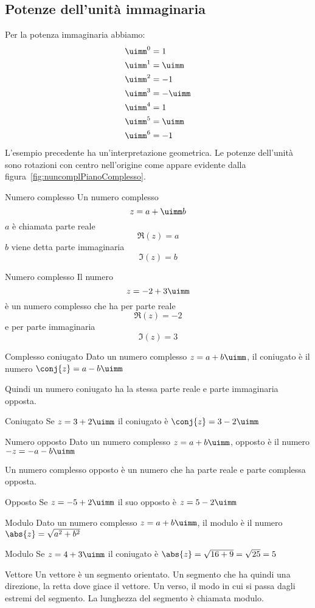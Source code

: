 \subsection{Potenze dell'unità immaginaria}
Per la potenza immaginaria abbiamo:
\begin{align*}
	&\uimm^0=1\\
	&\uimm^1=\uimm\\
	&\uimm^2=-1\\
	&\uimm^3=-\uimm\\
	&\uimm^4=1\\
	&\uimm^5=\uimm\\
	&\uimm^6=-1
\end{align*}
L'esempio precedente ha un'interpretazione geometrica. Le potenze dell'unità sono rotazioni  con  centro nell'origine come appare evidente dalla figura~\vref{fig:nuncomplPianoComplesso}.
\begin{definizionet}{Numero complesso}{}
	 Un numero complesso  \[z=a+\uimm b\] $a$ è chiamata parte reale \[\Re\left(z\right)=a\]
	$b$ viene detta  parte immaginaria\[\Im\left(z\right)=b \] 
\end{definizionet}
\begin{esempiot}{Numero complesso}{}
Il numero \[z=-2+3\uimm \] è un numero complesso che ha per parte reale \[\Re(z)=-2\]  e per parte immaginaria \[\Im(z)=3\]
\end{esempiot}
\begin{definizionet}{Complesso coniugato}{}
	Dato un numero complesso $z=a+b\uimm$, il coniugato è  il numero $\conj{z}=a-b\uimm$
\end{definizionet}
Quindi un numero coniugato ha la stessa parte reale e parte immaginaria opposta.
\begin{esempiot}{Coniugato}{}
Se $z=3+2\uimm$ il coniugato è $\conj{z}=3-2\uimm$ 
\end{esempiot}
\begin{definizionet}{Numero opposto}{}
Dato un numero complesso $z=a+b\uimm$,  opposto 
è  il numero $-z=-a-b\uimm$
\end{definizionet}
Un numero complesso opposto è un numero che ha parte reale e parte complessa 
opposta.
\begin{esempiot}{Opposto}{}
	Se $z=-5+2\uimm$ il suo opposto è $z=5-2\uimm$
\end{esempiot}
\begin{definizionet}{Modulo}{}
Dato un numero  complesso $z=a+b\uimm$, il modulo è il numero $\abs{z}=\sqrt{a^2+b^2}$
\end{definizionet}
\begin{esempiot}{Modulo}{}
	Se $z=4+3\uimm$ il coniugato è $\abs{z}=\sqrt{16+9}=\sqrt{25}=5$
\end{esempiot}
\begin{definizionet}{Vettore}{}
	Un vettore è un segmento orientato. Un segmento che ha 
	quindi una direzione, la retta dove giace il vettore. Un verso, il modo in 
	cui si passa dagli estremi del segmento. 
	La lunghezza del segmento è chiamata modulo.
\end{definizionet}
